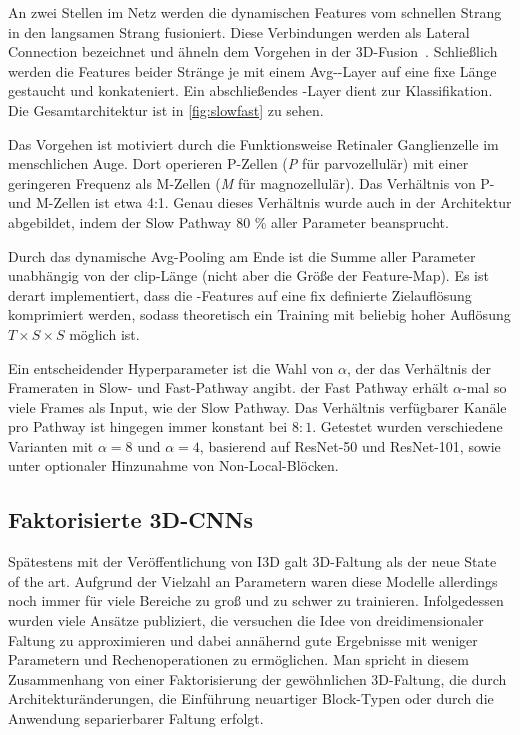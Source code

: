 An zwei Stellen im Netz werden die dynamischen Features vom schnellen Strang in den langsamen Strang fusioniert.
Diese Verbindungen werden als Lateral Connection bezeichnet und ähneln dem Vorgehen in der 3D-Fusion~\cite{Feichtenhofer16}.
Schließlich werden die Features beider Stränge je mit einem Avg-\pool-Layer auf eine fixe Länge gestaucht und konkateniert.
Ein abschließendes \fc-Layer dient zur Klassifikation.
Die Gesamtarchitektur ist in \autoref{fig:slowfast} zu sehen.

Das Vorgehen ist motiviert durch die Funktionsweise Retinaler Ganglienzelle im menschlichen Auge.
Dort operieren P-Zellen (\emph{P} für parvozellulär) mit einer geringeren Frequenz als M-Zellen (\emph{M} für magnozellulär).
Das Verhältnis von P- und M-Zellen ist etwa 4:1.
Genau dieses Verhältnis wurde auch in der Architektur abgebildet, indem der Slow Pathway 80 \% aller Parameter beansprucht.

Durch das dynamische Avg-Pooling am Ende ist die Summe aller Parameter unabhängig von der \gls{clip}-Länge (nicht aber die Größe der Feature-Map).
Es ist derart implementiert, dass die \conv-Features auf eine fix definierte Zielauflösung komprimiert werden, sodass theoretisch ein Training mit beliebig hoher Auflösung $T \times S \times S$ möglich ist.

Ein entscheidender Hyperparameter ist die Wahl von $\alpha$, der das Verhältnis der Frameraten in Slow- und Fast-Pathway angibt.
\Dh der Fast Pathway erhält $\alpha$-mal so viele Frames als Input, wie der Slow Pathway.
Das Verhältnis verfügbarer Kanäle pro Pathway ist hingegen immer konstant bei $8:1$.
Getestet wurden verschiedene Varianten mit $\alpha = 8$ und $\alpha = 4$, basierend auf ResNet-50 und ResNet-101, sowie unter optionaler Hinzunahme von Non-Local-Blöcken.

\subsection{Faktorisierte 3D-CNNs}
\label{subsec:factorized-convolution}

Spätestens mit der Veröffentlichung von I3D galt 3D-Faltung als der neue State of the art.
Aufgrund der Vielzahl an Parametern waren diese Modelle allerdings noch immer für viele Bereiche zu groß und zu schwer zu trainieren.
Infolgedessen wurden viele Ansätze publiziert, die versuchen die Idee von dreidimensionaler Faltung zu approximieren und dabei annähernd gute Ergebnisse mit weniger Parametern und Rechenoperationen zu ermöglichen.
Man spricht in diesem Zusammenhang von einer Faktorisierung der gewöhnlichen 3D-Faltung, die durch Architekturänderungen, die Einführung neuartiger Block-Typen oder durch die Anwendung separierbarer Faltung erfolgt.

